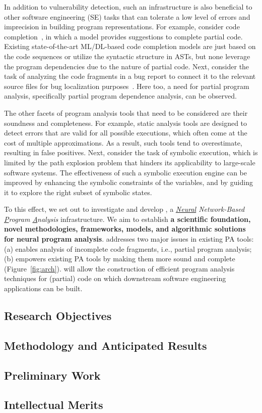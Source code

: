 In addition to vulnerability detection, such an 
infrastructure
is also beneficial to other software engineering (SE) tasks that can tolerate a low level of errors and imprecision in building program representations. For example, consider code completion~\cite{codefill-icse22,facebook-icse21}, in which a model provides suggestions to complete partial code. Existing state-of-the-art ML/DL-based code completion models are just based on the code sequences or utilize the syntactic structure in ASTs, but none leverage the program dependencies due to the nature of partial code. Next, consider the task of analyzing the code fragments in a bug report to connect it to the relevant source files for bug localization purposes~\cite{euler-fse19,icpc17}. Here too, a need for partial program analysis, specifically partial program dependence analysis, can be observed.

The other facets of program analysis tools that need to be considered are their soundness and completeness. For example, static analysis tools are designed to detect errors that are valid for all possible executions, which often come at the cost of multiple approximations. As a result, such tools tend to overestimate, resulting in false positives. Next, consider the task of symbolic execution, which is limited by the path explosion problem that hinders its applicability to large-scale software systems. The effectiveness of such a symbolic execution engine can be improved by enhancing the symbolic constraints of the variables, and by guiding it to explore the right subset of symbolic states. 

To this effect, we set out to investigate and develop {\tool}, a {\em \underline{Neural} Network-Based \underline{P}rogram \underline{A}nalysis} infrastructure. We aim to establish {\bf a scientific foundation, novel methodologies, frameworks, models, and algorithmic solutions for neural program analysis}. {\tool} addresses two major issues in existing PA tools: (a) enables analysis of incomplete code fragments, i.e., partial program analysis; (b) empowers existing PA tools by making them more sound and complete (Figure~\ref{fig:arch}). {\tool} will allow the construction of efficient program analysis techniques for (partial) code on which downstream software engineering applications can be built.

\subsection{Research Objectives}

\subsection{Methodology and Anticipated Results}


\subsection{Preliminary Work}


\subsection{Intellectual Merits}


